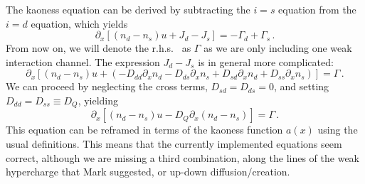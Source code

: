 \documentclass[11pt]{article}
\newcommand{\p}{\partial}
\begin{document}
The kaoness equation can be derived by subtracting the $i=s$ equation from the $i=d$ equation, which yields
\begin{equation}
    \p_x\left[(n_d-n_s)u+J_d-J_s \right]=-\Gamma_d+\Gamma_s \, .
\end{equation}
From now on, we will denote the r.h.s.~ as $\Gamma$ as we are only including one weak interaction channel.
The expression $J_d-J_s$ is in general more complicated:
\begin{equation}
    \p_x\left[(n_d-n_s)u+\left(-D_{dd}\p_xn_d-D_{ds}\p_xn_s+D_{sd}\p_xn_d+D_{ss}\p_xn_s \right) \right]=\Gamma \, .
\end{equation}
We can proceed by neglecting the cross terms, $D_{sd}=D_{ds}=0$, and setting $D_{dd}=D_{ss}\equiv D_Q$, yielding
\begin{equation}
    \p_x\left[(n_d-n_s)u-D_Q\p_x(n_d-n_s)\right]=\Gamma \, .
\end{equation}
This equation can be reframed in terms of the kaoness function $a(x)$ using the usual definitions.
This means that the currently implemented equations seem correct, although we are missing a third combination, along the lines of the weak hypercharge that Mark suggested, or up-down diffusion/creation.
\end{document}
